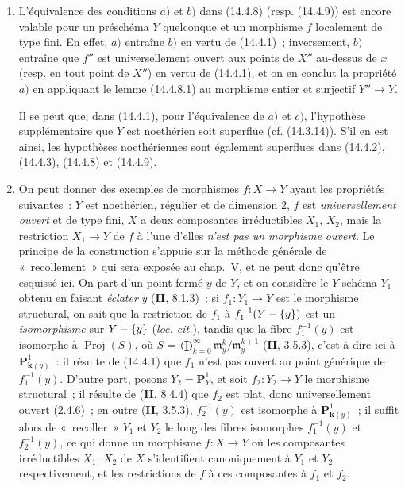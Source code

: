 \begin{remarks}[14.4.10]
\label{IV.14.4.10-fr}
\begin{enumerate}[label=(\roman*)]
  \item L'équivalence des conditions $a)$ et $b)$ dans (14.4.8) (resp. (14.4.9))
  est encore valable pour un préschéma $Y$ quelconque et un morphisme $f$
  localement de type fini. En effet, $a)$ entraîne $b)$ en vertu de (14.4.1)~;
  inversement, $b)$ entraîne que $f''$ est universellement ouvert aux points de
  $X''$ au-dessus de $x$ (resp. en tout point de $X''$) en vertu de (14.4.1), et
  on en conclut la propriété $a)$ en appliquant le lemme (14.4.8.1) au morphisme
  entier et surjectif $Y''\to Y$.

  Il se peut que, dans (14.4.1), pour l'équivalence de $a)$ et $c)$, l'hypothèse
  supplémentaire que $Y$ est noethérien soit superflue (cf. (14.3.14)). S'il en
  est ainsi, les hypothèses noethériennes sont également superflues dans (14.4.2),
  (14.4.3), (14.4.8) et (14.4.9).

  \item On peut donner des exemples de morphismes $f:X\to Y$ ayant les propriétés
  suivantes~: $Y$ est noethérien, régulier et de dimension 2, $f$ est
  \emph{universellement ouvert} et de type fini, $X$ a deux composantes
  irréductibles $X_1$, $X_2$, mais la restriction $X_1\to Y$ de $f$ à l'une
  d'elles \emph{n'est pas un morphisme ouvert}. Le principe de la construction
  s'appuie sur la méthode générale de «~recollement~» qui sera exposée au chap.~V,
  et ne peut donc qu'être esquissé ici. On part d'un point fermé $y$ de $Y$, et on
  considère le $Y$-schéma $Y_1$ obtenu en faisant \emph{éclater} $y$
  (\textbf{II}, 8.1.3)~; si $f_1:Y_1\to Y$ est le morphisme structural, on sait que
  la restriction de $f_1$ à $f_1^{-1}(Y-\{y\})$ est un \emph{isomorphisme} sur
  $Y-\{y\}$ (\emph{loc. cit.}), tandis que la fibre $f_1^{-1}(y)$ est isomorphe à
  $\operatorname{Proj}(S)$, où
  $S=\bigoplus_{k=0}^{\infty}\mathfrak m_y^k/\mathfrak m_y^{k+1}$
  (\textbf{II}, 3.5.3), c'est-à-dire ici à $\mathbf P^1_{\mathbf{k}(y)}$~: il résulte de
  (14.4.1) que $f_1$ n'est pas ouvert au point générique de $f_1^{-1}(y)$. D'autre
  part, posons $Y_2=\mathbf P^1_Y$, et soit $f_2:Y_2\to Y$ le morphisme structural~;
  il résulte de (\textbf{II}, 8.4.4) que $f_2$ est plat, donc universellement ouvert
  (2.4.6)~; en outre (\textbf{II}, 3.5.3), $f_2^{-1}(y)$ est isomorphe à
  $\mathbf P^1_{\mathbf{k}(y)}$~; il suffit alors de «~recoller~» $Y_1$ et $Y_2$ le long des
  fibres isomorphes $f_1^{-1}(y)$ et $f_2^{-1}(y)$, ce qui donne un morphisme
  $f:X\to Y$ où les composantes irréductibles $X_1$, $X_2$ de $X$ s'identifient
  canoniquement à $Y_1$ et $Y_2$ respectivement, et les restrictions de $f$ à ces
  composantes à $f_1$ et $f_2$.


\end{enumerate}
\end{remarks}
